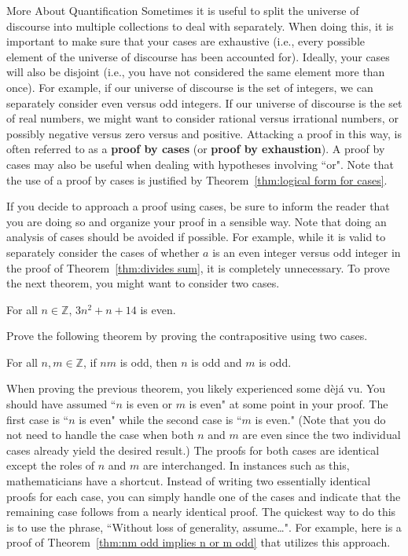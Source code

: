 \begin{section}{More About Quantification}
Sometimes it is useful to split the universe of discourse into multiple collections to deal with separately.  When doing this, it is important to make sure that your cases are exhaustive (i.e., every possible element of the universe of discourse has been accounted for).  Ideally, your cases will also be disjoint (i.e., you have not considered the same element more than once).  For example, if our universe of discourse is the set of integers, we can separately consider even versus odd integers. If our universe of discourse is the set of real numbers, we might want to consider rational versus irrational numbers, or possibly negative versus zero versus and positive. Attacking a proof in this way, is often referred to as a \textbf{proof by cases} (or \textbf{proof by exhaustion}). A proof by cases may also be useful when dealing with hypotheses involving ``or".  Note that the use of a proof by cases is justified by Theorem~\ref{thm:logical form for cases}.

If you decide to approach a proof using cases, be sure to inform the reader that you are doing so and organize your proof in a sensible way. Note that doing an analysis of cases should be avoided if possible. For example, while it is valid to separately consider the cases of whether $a$ is an even integer versus odd integer in the proof of Theorem~\ref{thm:divides sum}, it is completely unnecessary.  To prove the next theorem, you might want to consider two cases.

\begin{theorem}\label{thm:3n^2+n+14 is even}
For all $n\in \mathbb{Z}$, $3n^2+n+14$ is even.
\end{theorem}

Prove the following theorem by proving the contrapositive using two cases.

\begin{theorem}\label{thm:nm odd implies n or m odd} %
For all $n,m\in\mathbb{Z}$, if $nm$ is odd, then $n$ is odd and $m$ is odd.
\end{theorem}

When proving the previous theorem, you likely experienced some d\`ej\'a vu. You should have assumed ``$n$ is even or $m$ is even" at some point in your proof. The first case is ``$n$ is even" while the second case is ``$m$ is even."  (Note that you do not need to handle the case when both $n$ and $m$ are even since the two individual cases already yield the desired result.) The proofs for both cases are identical except the roles of $n$ and $m$ are interchanged.  In instances such as this, mathematicians have a shortcut. Instead of writing two essentially identical proofs for each case, you can simply handle one of the cases and indicate that the remaining case follows from a nearly identical proof.  The quickest way to do this is to use the phrase, ``Without loss of generality, assume\ldots".  For example, here is a proof of Theorem~\ref{thm:nm odd implies n or m odd} that utilizes this approach.\\


\end{section}

